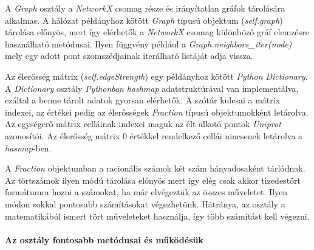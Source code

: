 \documentclass[a4paper,12pt]{article}
\begin{document}
		A \textit{Graph} osztály a \textit{NetworkX} csomag része és irányítatlan gráfok tárolására alkalmas. A hálózat példányhoz kötött \textit{Graph} típusú objektum (\textit{self.graph}) tárolása előnyös, mert így elérhetők a \textit{NetworkX} csomag különböző gráf elemzésre használható metódusai. Ilyen függvény például a \textit{Graph.neighbors\_iter(node)} mely egy adott pont szomszédjainak iterálható listáját adja vissza.
		
		Az élerősség mátrix (\textit{self.edgeStrength}) egy példányhoz kötött \textit{Python Dictionary}. A \textit{Dictionary} osztály   \textit{Pythonban} \textit{hashmap} adatstruktúrával van implementálva, ezáltal a benne tárolt adatok gyorsan elérhetők. A szótár kulcsai a mátrix indexei, az értékei pedig az élerősségek \textit{Fraction} típusú objektumokként letárolva. Az egységerő mátrix celláinak indexei maguk az élt alkotó pontok \textit{Uniprot} azonosítói. Az élerősség mátrix 0 értékkel rendelkező cellái nincsenek letárolva a \textit{hasmap}-ben.
		
		 A \textit{Fraction} objektumban a racionális számok két szám hányadosaként tárlódnak. Az törtszámok ilyen módú tárolása előnyös mert így elég csak akkor tizedestört formátumra hozni a számokat, ha már elvégeztük az összes műveletet. Ilyen módon sokkal pontosabb számításokat végezhetünk. Hátránya, az osztály a matematikából ismert tört műveleteket használja, így több számítást kell végezni.
		
		\paragraph{Az osztály fontosabb metódusai és működésük}
\end{document}
